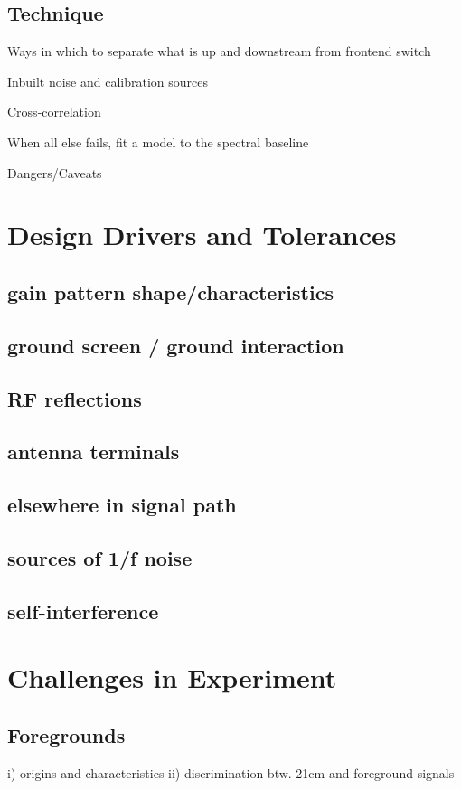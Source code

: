 \subsection{Technique}

Ways in which to separate what is up and downstream from frontend switch

Inbuilt noise and calibration sources

Cross-correlation

When all else fails, fit a model to the spectral baseline

Dangers/Caveats



\section{Design Drivers and Tolerances}

\subsection{gain pattern shape/characteristics}
\subsection{ground screen / ground interaction}
\subsection{RF reflections}
\subsection{antenna terminals}
\subsection{elsewhere in signal path}
\subsection{sources of 1/f noise}
\subsection{self-interference}


\section{Challenges in Experiment}

\subsection{Foregrounds}
i)	origins and characteristics
ii)	discrimination btw. 21cm and foreground signals
